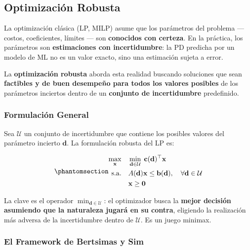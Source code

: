 \documentclass[
  spanish,
  11pt,
  letterpaper,
]{scrbook}
\theoremstyle{plain}
\theoremstyle{remark}
\begin{document}
\subsection{Optimización Robusta}\label{sec-robust-optimization}

La optimización clásica (LP, MILP) asume que los parámetros del problema
--- costos, coeficientes, límites --- son \textbf{conocidos con
certeza}. En la práctica, los parámetros son \textbf{estimaciones con
incertidumbre}: la PD predicha por un modelo de ML no es un valor
exacto, sino una estimación sujeta a error.

La \textbf{optimización robusta} aborda esta realidad buscando
soluciones que sean \textbf{factibles y de buen desempeño para todos los
valores posibles} de los parámetros inciertos dentro de un
\textbf{conjunto de incertidumbre} predefinido.

\subsubsection{Formulación General}\label{formulaciuxf3n-general}

Sea \(\mathcal{U}\) un conjunto de incertidumbre que contiene los
posibles valores del parámetro incierto \(\mathbf{d}\). La formulación
robusta del LP es:

\begin{equation}\protect\phantomsection\label{eq-robust-general}{
\begin{aligned}
\max_{\mathbf{x}} \quad & \min_{\mathbf{d} \in \mathcal{U}} \; \mathbf{c}(\mathbf{d})^\top \mathbf{x} \\
\text{s.a.} \quad & A(\mathbf{d})\mathbf{x} \leq \mathbf{b}(\mathbf{d}), \quad \forall \mathbf{d} \in \mathcal{U} \\
& \mathbf{x} \geq \mathbf{0}
\end{aligned}
}\end{equation}

La clave es el operador \(\min_{\mathbf{d} \in \mathcal{U}}\): el
optimizador busca la \textbf{mejor decisión asumiendo que la naturaleza
jugará en su contra}, eligiendo la realización más adversa de la
incertidumbre dentro de \(\mathcal{U}\). Es un juego minimax.

\subsubsection{El Framework de Bertsimas y
Sim}\label{el-framework-de-bertsimas-y-sim}
\end{document}
